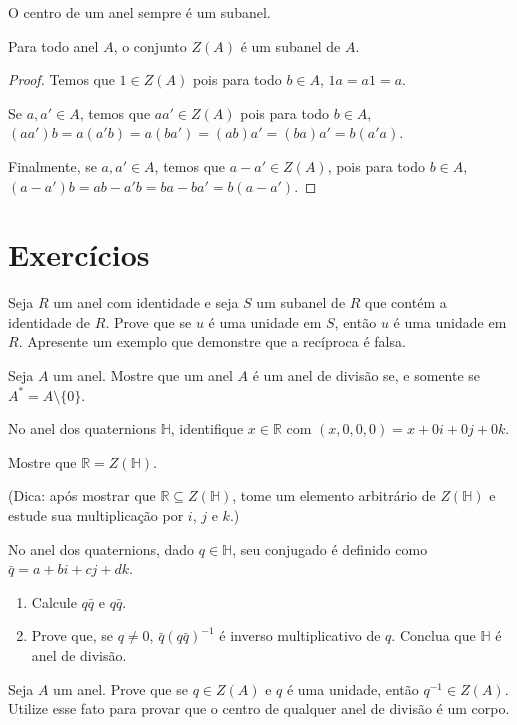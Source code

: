 O centro de um anel sempre é um subanel.

\begin{prop}
    Para todo anel $A$, o conjunto $Z(A)$ é um subanel de $A$.
\end{prop}

\begin{proof}
    Temos que $1 \in Z(A)$ pois para todo $b \in A$, $1a=a1=a$.

    Se $a, a' \in A$, temos que $aa' \in Z(A)$ pois para todo $b \in A$, $(aa')b=a(a'b)=a(ba')=(ab)a'=(ba)a'=b(a'a)$.

    Finalmente, se $a, a' \in A$, temos que $a-a' \in Z(A)$, pois para todo $b \in A$, $(a-a')b=ab-a'b=ba-ba'=b(a-a')$.
\end{proof}

\section{Exercícios}

\begin{exer} Seja $R$ um anel com identidade e seja $S$ um subanel de $R$ que contém a identidade de $R$.
Prove que se $u$ é uma unidade em $S$, então $u$ é uma unidade em $R$.
Apresente um exemplo que demonstre que a recíproca é falsa.

\end{exer} 
\begin{exer}
    Seja $A$ um anel. Mostre que um anel $A$ é um anel de divisão se, e somente se $A^*=A\setminus\{0\}$.
\end{exer}

\begin{exer}
    No anel dos quaternions $\mathbb H$, identifique $x \in \mathbb R$ com $(x, 0, 0, 0)=x+0i+0j+0k$.

    Mostre que $\mathbb R=Z(\mathbb H)$.

    (Dica: após mostrar que $\mathbb R\subseteq Z(\mathbb H)$, tome um elemento arbitrário de $Z(\mathbb H)$ e estude sua multiplicação por $i$, $j$ e $k$.)
\end{exer}
\begin{exer}\label{exer:quaternion}
    No anel dos quaternions, dado $q \in \mathbb H$, seu conjugado é definido como $\bar q = a + bi + cj + dk$.

    \begin{enumerate}[label=\alph*)]
        \item Calcule  $q\bar q$ e $q\bar q$.
        \item Prove que, se $q\neq 0$,  $\bar q(q\bar q)^{-1}$ é inverso multiplicativo de $q$.
        Conclua que $\mathbb H$ é anel de divisão.
    \end{enumerate}
\end{exer}
\begin{exer}
    Seja $A$ um anel. Prove que se $q \in Z(A)$ e $q$ é uma unidade, então $q^{-1} \in Z(A)$.
    Utilize esse fato para provar que o centro de qualquer anel de divisão é um corpo.
\end{exer}
